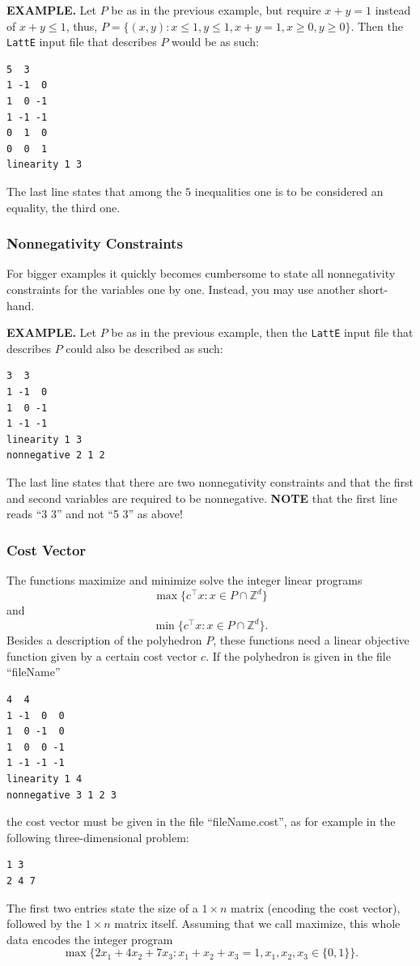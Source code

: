 \documentclass{article}
\newcommand{\Z}{{\mathbb Z}}
\begin{document}
\textbf{EXAMPLE.}
Let $P$ be as in the previous example, but require $x+y=1$ instead of
$x+y\leq 1$, thus, 
$P=\{(x,y): x\leq 1, y\leq 1, x+y=1, x\geq 0, y\geq 0\}$.
Then the {\tt LattE} input file that describes $P$ would be as such:
\begin{verbatim}
5  3
1 -1  0
1  0 -1
1 -1 -1
0  1  0
0  0  1
linearity 1 3
\end{verbatim}
The last line states that among the $5$ inequalities one is to be
considered an equality, the third one.

\subsubsection{Nonnegativity Constraints}
For bigger examples it quickly becomes cumbersome to state all
nonnegativity constraints for the variables one by one. Instead, you
may use another short-hand.

\textbf{EXAMPLE.}
Let $P$ be as in the previous example, then the {\tt LattE} input file
that describes $P$ could also be described as such: 
\begin{verbatim}
3  3
1 -1  0
1  0 -1
1 -1 -1
linearity 1 3
nonnegative 2 1 2
\end{verbatim}
The last line states that there are two nonnegativity constraints and
that the first and second variables are required to be nonnegative. 
{\bf NOTE} that the first line reads ``3 3'' and not ``5 3'' as above! 

\subsubsection{Cost Vector}
The functions maximize and minimize solve the integer linear programs
\[
\max\{c^\intercal x: x\in P\cap\Z^d\}
\]
and
\[
\min\{c^\intercal x: x\in P\cap\Z^d\}.
\]
Besides a description of the polyhedron $P$, these functions need a
linear objective function given by a certain cost vector $c$. If the
polyhedron is given in the file ``fileName''
\begin{verbatim}
4  4
1 -1  0  0
1  0 -1  0
1  0  0 -1
1 -1 -1 -1
linearity 1 4
nonnegative 3 1 2 3
\end{verbatim}
the cost vector must be given in the file ``fileName.cost'', as for
example in the following three-dimensional problem: 
\begin{verbatim}
1 3
2 4 7
\end{verbatim}
The first two entries state the size of a $1\times n$ matrix (encoding
the cost vector), followed by the $1\times n$ matrix itself. Assuming
that we call maximize, this whole data encodes the integer program
\[
\max\{2x_1+4x_2+7x_3: x_1+x_2+x_3=1, x_1,x_2,x_3\in\{0,1\}\}.
\]
\end{document}
